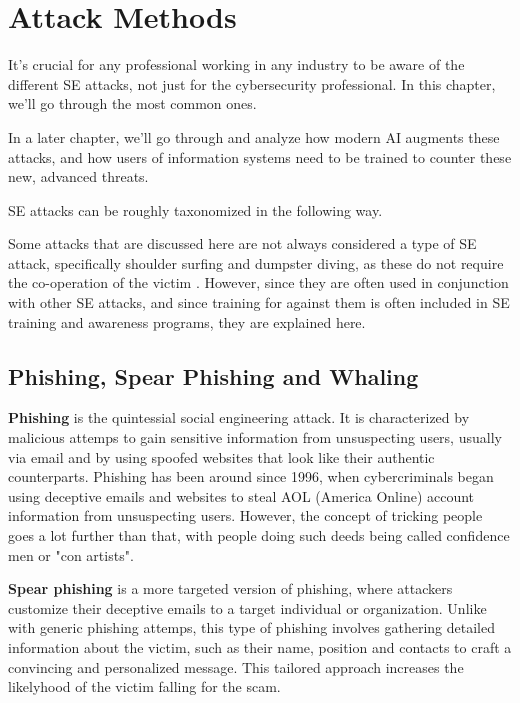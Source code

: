 
\chapter{Attack Methods\label{methods}}

It's crucial for any professional working in any industry to be aware of the different SE attacks, not just for the cybersecurity professional. In this chapter, we'll go through the most common ones.

In a later chapter, we'll go through and analyze how modern AI augments these attacks, and how users of information systems need to be trained to counter these new, advanced threats.

SE attacks can be roughly taxonomized in the following way.


Some attacks that are discussed here are not always considered a type of SE attack, specifically shoulder surfing and dumpster diving, as these do not require the co-operation of the victim \citep{wang_defining_2020}. However, since they are often used in conjunction with other SE attacks, and since training for against them is often included in SE training and awareness programs, they are explained here.

\section{Phishing, Spear Phishing and Whaling}

\textbf{Phishing} is the quintessial social engineering attack. It is characterized by malicious attemps to gain sensitive information from unsuspecting users, usually via email and by using spoofed websites that look like their authentic counterparts. Phishing has been around since 1996, when cybercriminals began using deceptive emails and websites to steal AOL (America Online) account information from unsuspecting users. However, the concept of tricking people goes a lot further than that, with people doing such deeds being called confidence men or "con artists". 

\textbf{Spear phishing} is a more targeted version of phishing, where attackers customize their deceptive emails to a target individual or organization. Unlike with generic phishing attemps, this type of phishing involves gathering detailed information about the victim, such as their name, position and contacts to craft a convincing and personalized message. This tailored approach increases the likelyhood of the victim falling for the scam.

